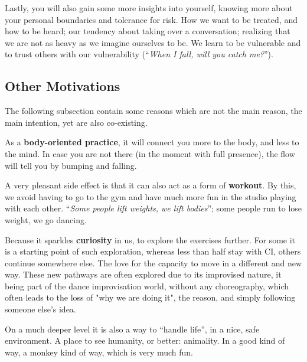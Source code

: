 Lastly, you will also gain some more insights into yourself, knowing more about your personal boundaries and tolerance for risk.
How we want to be treated, and how to be heard;
our tendency about taking over a conversation; realizing that we are not as heavy as we imagine ourselves to be.
We learn to be vulnerable and to trust others with our vulnerability (``\textit{When I fall, will you catch me?}'').

\subsection{Other Motivations}\label{subsec:other-motivations}

The following subsection contain some reasons which are not the main reason, the main intention, yet are also co-existing.

As a \textbf{body-oriented practice}, it will connect you more to the body, and less to the mind.
In case you are not there (in the moment with full presence), the flow will tell you by bumping and falling.

A very pleasant side effect is that it can also act as a form of \textbf{workout}.
By this, we avoid having to go to the gym and have much more fun in the studio playing with each other.
``\textit{Some people lift weights, we lift bodies}'';
some people run to lose weight, we go dancing.

Because it sparkles \textbf{curiosity} in us, to explore the exercises further.
For some it is a starting point of such exploration, whereas less than half stay with CI, others continue somewhere else.
The love for the capacity to move in a different and new way.
These new pathways are often explored due to its improvised nature, it being part of the dance improvisation world, without any choreography, which often leads to the loss of "why we are doing it", the reason, and simply following someone else's idea.

On a much deeper level it is also a way to ``handle life'', in a nice, safe environment.
A place to see humanity, or better: animality.
In a good kind of way, a monkey kind of way, which is very much fun.
